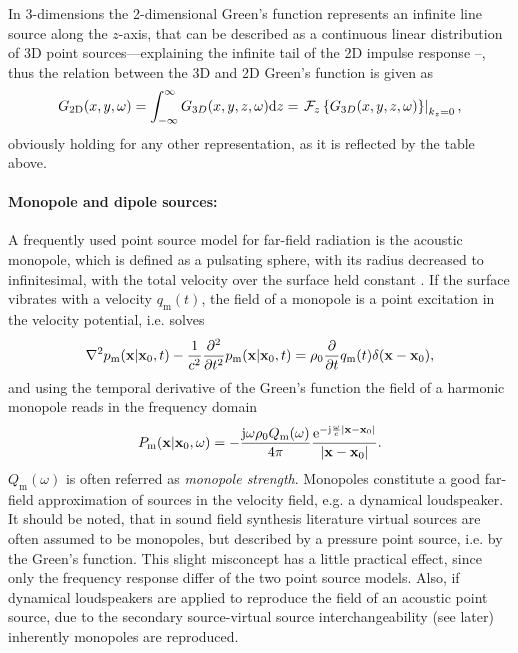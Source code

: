 \vspace{3mm}
In 3-dimensions the 2-dimensional Green's function represents an infinite line source along the $z$-axis, that can be described as a continuous linear distribution of 3D point sources---explaining the infinite tail of the 2D impulse response%
--, thus the relation between the 3D and 2D Green's function is given as
\begin{equation}
G_{2\mathrm{D}}(x,y,\omega) = \int_{-\infty}^{\infty} G_{3D}(x,y,z,\omega) \mathrm{d} z = \left. \mathcal{F}_{z}\left\{ G_{3D}(x,y,z,\omega) \right\}\right|_{k_z = 0},
\end{equation} 
obviously holding for any other representation, as it is reflected by the table above.

\paragraph{Monopole and dipole sources:\\} 
A frequently used point source model for far-field radiation is the acoustic monopole, which is defined as a pulsating sphere, with its radius decreased to infinitesimal, with the total velocity over the surface held constant \cite{Howe2007}. If the surface vibrates with a velocity $q_{\mathrm{m}}(t)$, the field of a monopole is a point excitation in the velocity potential, i.e. solves
\begin{equation}
\nabla^2 p_{\mathrm{m}}(\mathbf{x}|\mathbf{x}_0,t) - 	\frac{1}{c^2}\frac{\partial^2}{\partial t^2}p_{\mathrm{m}}(\mathbf{x}|\mathbf{x}_0,t) = \rho_0 \frac{\partial}{\partial t} q_{\mathrm{m}}(t)\delta(\mathbf{x}-\mathbf{x}_0),
\end{equation}
and using the temporal derivative of the Green's function the field of a harmonic monopole reads in the frequency domain
\begin{equation}
P_{\mathrm{m}}(\mathbf{x}|\mathbf{x}_0,\omega) = -\frac{\mathrm{j} \omega \rho_0 Q_{\mathrm{m}}(\omega)}{4\pi}\frac{\mathrm{e}^{-\mathrm{j} \frac{\omega}{c}|\mathbf{x}-\mathbf{x}_0|}}{|\mathbf{x}-\mathbf{x}_0|}.
\end{equation}
$Q_{\mathrm{m}}(\omega)$ is often referred as \emph{monopole strength}. Monopoles constitute a good far-field approximation of sources in the velocity field, e.g. a dynamical loudspeaker. It should be noted, that in sound field synthesis literature virtual sources are often assumed to be monopoles, but described by a pressure point source, i.e.  by the Green's function. This slight misconcept has a little practical effect, since only the frequency response differ of the two point source models. Also, if dynamical loudspeakers are applied to reproduce the field of an acoustic point source, due to the secondary source-virtual source interchangeability (see later) inherently monopoles are reproduced.

